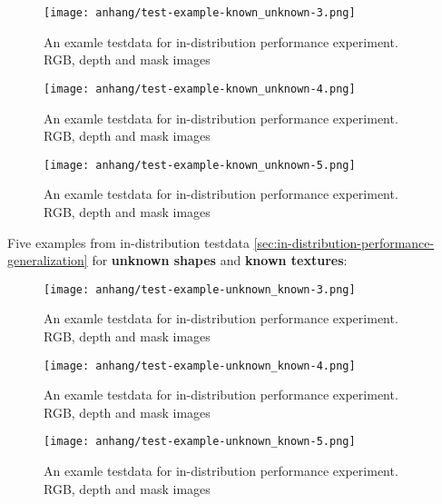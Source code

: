 	\begin{figure}[H]
		\centering
		\texttt{[image: anhang/test-example-known\_unknown-3.png]}
		\caption[An examle testdata for in-distribution performance experiment. RGB, depth and mask images]{An examle testdata for in-distribution performance experiment. RGB, depth and mask images}
	\end{figure}
	\begin{figure}[H]
		\centering
		\texttt{[image: anhang/test-example-known\_unknown-4.png]}
		\caption[An examle testdata for in-distribution performance experiment. RGB, depth and mask images]{An examle testdata for in-distribution performance experiment. RGB, depth and mask images}
	\end{figure}
	\begin{figure}[H]
		\centering
		\texttt{[image: anhang/test-example-known\_unknown-5.png]}
		\caption[An examle testdata for in-distribution performance experiment. RGB, depth and mask images]{An examle testdata for in-distribution performance experiment. RGB, depth and mask images}
	\end{figure}
	
	
	
	\FloatBarrier
	\clearpage
	Five examples from in-distribution testdata \ref{sec:in-distribution-performance-generalization} for \textbf{unknown shapes} and \textbf{known textures}:
	
	\begin{figure}[H]
		\centering
		\texttt{[image: anhang/test-example-unknown\_known-3.png]}
		\caption[An examle testdata for in-distribution performance experiment. RGB, depth and mask images]{An examle testdata for in-distribution performance experiment. RGB, depth and mask images}
	\end{figure}
	\begin{figure}[H]
		\centering
		\texttt{[image: anhang/test-example-unknown\_known-4.png]}
		\caption[An examle testdata for in-distribution performance experiment. RGB, depth and mask images]{An examle testdata for in-distribution performance experiment. RGB, depth and mask images}
	\end{figure}
	\begin{figure}[H]
		\centering
		\texttt{[image: anhang/test-example-unknown\_known-5.png]}
		\caption[An examle testdata for in-distribution performance experiment. RGB, depth and mask images]{An examle testdata for in-distribution performance experiment. RGB, depth and mask images}
	\end{figure}
	
